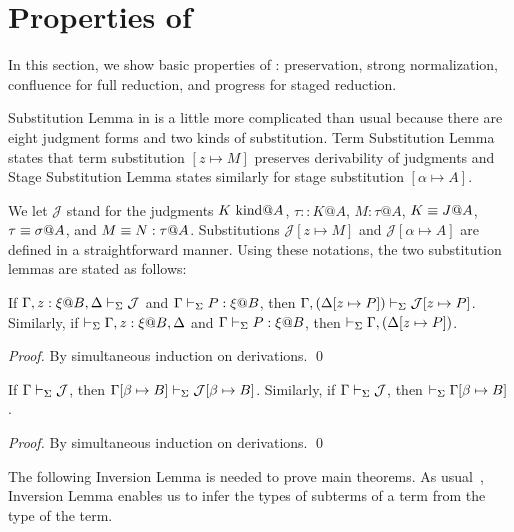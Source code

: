 
\section{Properties of \LMD \label{sec:properties}}

In this section, we show basic properties of \LMD: preservation, strong normalization, confluence for full reduction, and progress for staged reduction.


Substitution Lemma in \LMD{} is a little more complicated than usual
because there are eight judgment forms and two kinds of substitution.
Term Substitution Lemma states that term substitution $[z \mapsto M]$
preserves derivability of judgments and Stage Substitution Lemma
states similarly for stage substitution $[\alpha\mapsto A]$.

We let $\mathcal{J}$ stand for the judgments $K \text{\ kind} @A$, $\tau::K@A$,
$M:\tau@A$, $K \equiv J @ A$, $\tau \equiv \sigma @ A$, and
$M \equiv N : \tau @ A$.  Substitutions $\mathcal{J}[z \mapsto M]$ and
$\mathcal{J}[\alpha \mapsto A]$ are defined in a straightforward
manner.  Using these notations, the two substitution lemmas are stated as follows:

\begin{lemma}
  If $\G, z:\xi@B, \D \V \mathcal{J}$ and $\Gamma\vdash_\Sigma P:\xi @B$, then $\Gamma, (\Delta[z \mapsto P]) \vdash_\Sigma \mathcal{J}[z \mapsto P]$.  Similarly, if $\V \G, z:\xi@B, \D$ and
  $\Gamma\vdash_\Sigma P:\xi @B$, then $\vdash_\Sigma \Gamma, (\Delta[z \mapsto P])$.
\end{lemma}

\begin{proof}
  By simultaneous induction on derivations.
 \qed
\end{proof}

\begin{lemma}
	If $\Gamma \vdash_\Sigma \mathcal{J}$, then $\Gamma[\beta\mapsto B] \vdash_\Sigma \mathcal{J}[\beta\mapsto B]$.  Similarly, if $\Gamma \vdash_\Sigma \mathcal{J}$, then $\vdash_\Sigma \Gamma[\beta\mapsto B]$.
\end{lemma}

\begin{proof}
  By simultaneous induction on derivations.
  \qed
\end{proof}


The following Inversion Lemma is needed to prove main theorems.
As usual~\cite{TAPL}, Inversion Lemma enables us to infer the types of subterms of a term from the type of the term.

